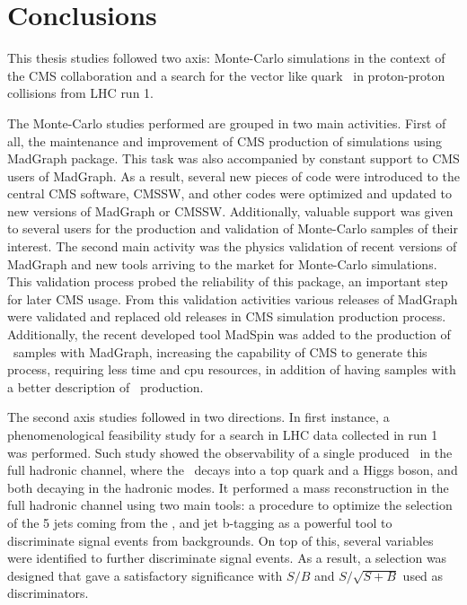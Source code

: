 \chapter*{Conclusions}

This thesis studies followed two axis: Monte-Carlo simulations in the context of the CMS collaboration and a search for the vector like quark \Tp~in proton-proton collisions from LHC run 1.

The Monte-Carlo studies performed are grouped in two main activities. First of all, the maintenance and improvement of CMS production of simulations using MadGraph package. This task was also accompanied by constant support to CMS users of MadGraph. As a result, several new pieces of code were introduced to the central CMS software, CMSSW, and other codes were optimized and updated to new versions of MadGraph or CMSSW. Additionally, valuable support was given to several users for the production and validation of Monte-Carlo samples of their interest. The second main activity was the physics validation of recent versions of MadGraph and new tools arriving to the market for Monte-Carlo simulations. This validation process probed the reliability of this package, an important step for later CMS usage. From this validation activities various releases of MadGraph were validated and replaced old releases in CMS simulation production process. Additionally, the recent developed tool MadSpin was added to the production of \ttbar~samples with MadGraph, increasing the capability of CMS to generate this process, requiring less time and cpu resources, in addition of having samples with a better description of \ttbar~production.

The second axis studies followed in two directions. In first instance, a phenomenological feasibility study for a search in LHC data collected in run 1 was performed. Such study showed the observability of a single produced \Tp~in the full hadronic channel, where the \Tp~decays into a top quark and a Higgs boson, and both decaying in the hadronic modes. It performed a mass reconstruction in the full hadronic channel using two main tools: a procedure to optimize the selection of the 5 jets coming from the \Tp, and jet b-tagging as a powerful tool to discriminate signal events from backgrounds. On top of this, several variables were identified to further discriminate signal events. As a result, a selection was designed that gave a satisfactory significance with $S/B$ and $S/\sqrt{S+B}$ used as discriminators.

